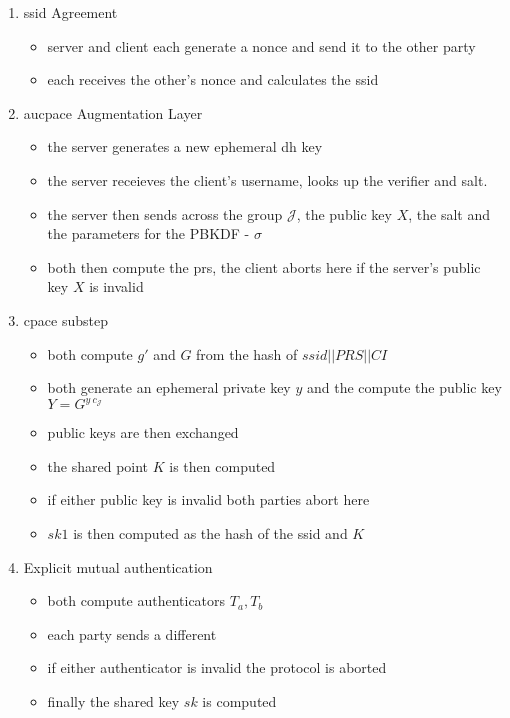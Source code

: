 \begin{enumerate}
  \item{
    \gls{ssid} Agreement
    \begin{itemize}
      \item{server and client each generate a \gls{nonce} and send it to the other party}
      \item{each receives the other's \gls{nonce} and calculates the \gls{ssid}}
    \end{itemize}
  }
  \item{
    \gls{aucpace} Augmentation Layer
    \begin{itemize}
      \item{the server generates a new ephemeral \gls{dh} key}
      \item{the server receieves the client's username, looks up the verifier and salt.}
      \item{the server then sends across the group $\mathcal{J}$, the public key $X$, the salt and the parameters for the PBKDF - $\sigma$}
      \item{both then compute the \gls{prs}, the client aborts here if the server's public key $X$ is invalid}
    \end{itemize}
  }
  \item{
    \gls{cpace} substep
    \begin{itemize}
      \item{both compute $g'$ and $G$ from the hash of $ssid||PRS||CI$}
      \item{both generate an ephemeral private key $y$ and the compute the public key $Y = G^{y\ c_{\mathcal{J}}}$}
      \item{public keys are then exchanged}
      \item{the shared point $K$ is then computed}
      \item{if either public key is invalid both parties abort here}
      \item{$sk1$ is then computed as the hash of the \gls{ssid} and $K$}
    \end{itemize}
  }
  \item{
    Explicit mutual authentication
    \begin{itemize}
      \item{both compute authenticators $T_a, T_b$}
      \item{each party sends a different}
      \item{if either authenticator is invalid the protocol is aborted}
      \item{finally the shared key $sk$ is computed}
    \end{itemize}
  }
\end{enumerate}

